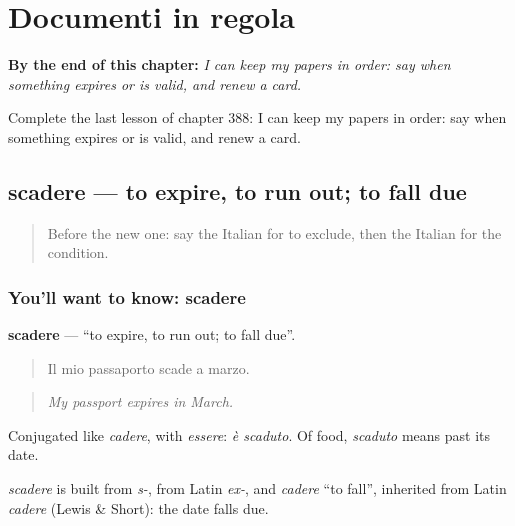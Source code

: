 
\chapter{Documenti in regola}
\label{ch:it-documenti-in-regola}

\begin{chapteropening}
\textbf{By the end of this chapter:} \emph{I can keep my papers in order: say when something expires or is valid, and renew a card.}

Complete the last lesson of chapter 388: I can keep my papers in order: say when something expires or is valid, and renew a card.
\end{chapteropening}

\section[scadere]{scadere — to expire, to run out; to fall due}

\label{lesson:IT-C388-scadere}



\begin{quote}
Before the new one: say the Italian for to exclude, then the Italian for the condition.
\end{quote}

\subsection*{You'll want to know: scadere}
\textbf{scadere} — \textquotedblleft{}to expire, to run out; to fall due\textquotedblright{}.

\begin{quote}
Il mio passaporto scade a marzo.
\end{quote}

\begin{quote}
\emph{My passport expires in March.}
\end{quote}

Conjugated like \emph{cadere}, with \emph{essere}: \emph{è scaduto}. Of food, \emph{scaduto} means past its date.

\begin{cousinweb}
\emph{scadere} is built from \emph{s-}, from Latin \emph{ex-}, and \emph{cadere} \textquotedblleft{}to fall\textquotedblright{}, inherited from Latin \emph{cadere} (Lewis \& Short): the date falls due.
\end{cousinweb}

